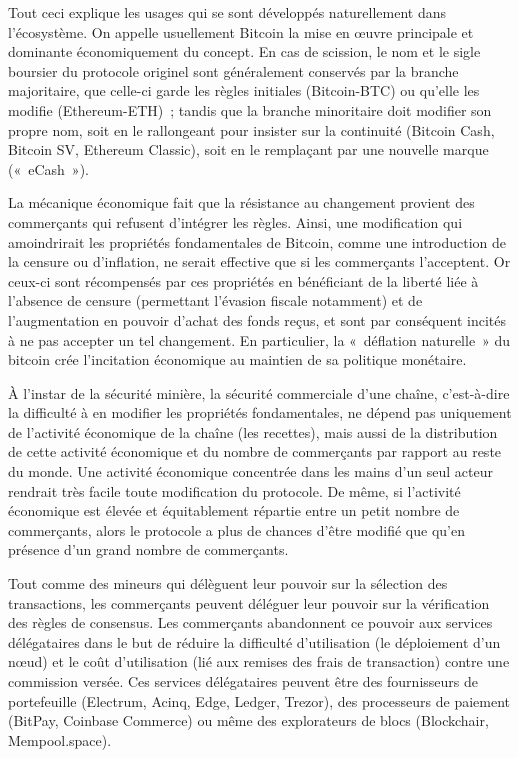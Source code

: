 Tout ceci explique les usages qui se sont développés naturellement dans l'écosystème. On appelle usuellement Bitcoin la mise en œuvre principale et dominante économiquement du concept. En cas de scission, le nom et le sigle boursier du protocole originel sont généralement conservés par la branche majoritaire, que celle-ci garde les règles initiales (Bitcoin-BTC) ou qu'elle les modifie (Ethereum-ETH)~; tandis que la branche minoritaire doit modifier son propre nom, soit en le rallongeant pour insister sur la continuité (Bitcoin Cash, Bitcoin SV, Ethereum Classic), soit en le remplaçant par une nouvelle marque («~eCash~»).

La mécanique économique fait que la résistance au changement provient des commerçants qui refusent d'intégrer les règles. Ainsi, une modification qui amoindrirait les propriétés fondamentales de Bitcoin, comme une introduction de la censure ou d'inflation, ne serait effective que si les commerçants l'acceptent. Or ceux-ci sont récompensés par ces propriétés en bénéficiant de la liberté liée à l'absence de censure (permettant l'évasion fiscale notamment) et de l'augmentation en pouvoir d'achat des fonds reçus, et sont par conséquent incités à ne pas accepter un tel changement. En particulier, la «~déflation naturelle~» du bitcoin crée l'incitation économique au maintien de sa politique monétaire.

À l'instar de la sécurité minière, la sécurité commerciale d'une chaîne, c'est-à-dire la difficulté à en modifier les propriétés fondamentales, ne dépend pas uniquement de l'activité économique de la chaîne (les recettes), mais aussi de la distribution de cette activité économique et du nombre de commerçants par rapport au reste du monde. Une activité économique concentrée dans les mains d'un seul acteur rendrait très facile toute modification du protocole. De même, si l'activité économique est élevée et équitablement répartie entre un petit nombre de commerçants, alors le protocole a plus de chances d'être modifié que qu'en présence d'un grand nombre de commerçants.

Tout comme des mineurs qui délèguent leur pouvoir sur la sélection des transactions, les commerçants peuvent déléguer leur pouvoir sur la vérification des règles de consensus. Les commerçants abandonnent ce pouvoir aux services délégataires dans le but de réduire la difficulté d'utilisation (le déploiement d'un nœud) et le coût d'utilisation (lié aux remises des frais de transaction) contre une commission versée. Ces services délégataires peuvent être des fournisseurs de portefeuille (Electrum, Acinq, Edge, Ledger, Trezor), des processeurs de paiement (BitPay, Coinbase Commerce) ou même des explorateurs de blocs (Blockchair, Mempool.space).

